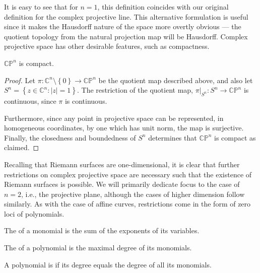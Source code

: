 It is easy to see that for $ n=1 $, this definition coincides with our original
definition for the complex projective line. This alternative formulation is
useful since it makes the Hausdorff nature of the space more overtly obvious ---
the quotient topology from the natural projection map will be Hausdorff. Complex
projective space has other desirable features, such as compactness.

\begin{proposition}
	$ \mathbb{C}\mathbb{P}^{n} $ is compact.
	\begin{proof}
		Let $ \pi: \mathbb{C}^{n}\setminus \left\{ 0 \right\}\to
			\mathbb{C}\mathbb{P}^{n} $ be the quotient map described above, and also let
		$ S^n = \left\{ z \in \mathbb{C}^{n}: |z|=1 \right\} $. The
		restriction of the quotient map, $
			\pi|_{S^n}:S^n\to \mathbb{C}\mathbb{P}^{n} $ is
		continuous, since $ \pi $ is continuous.

		Furthermore, since any point in projective space can be represented, in
		homogeneous coordinates, by one which has unit norm, the map is surjective.
		Finally, the closedness and boundedness of $ S^n $ determines
		that $ \mathbb{C}\mathbb{P}^{n} $ is compact as claimed.
	\end{proof}
\end{proposition}

Recalling that Riemann surfaces are one-dimensional, it is clear that
further restrictions on complex projective space are necessary such that the
existence of Riemann surfaces is possible. We will primarily dedicate focus to
the case of $ n=2 $, i.e., the projective plane, although the cases of higher
dimension follow similarly. As
with the case of affine curves, restrictions come in the form of zero loci of
polynomials.

\begin{definition}[Homogeneity]
	The  of a monomial is the sum of the exponents of its
	variables.

	The  of a polynomial is the maximal degree of its monomials.

	A polynomial is  if its degree equals the degree of all
	its monomials.
\end{definition}

